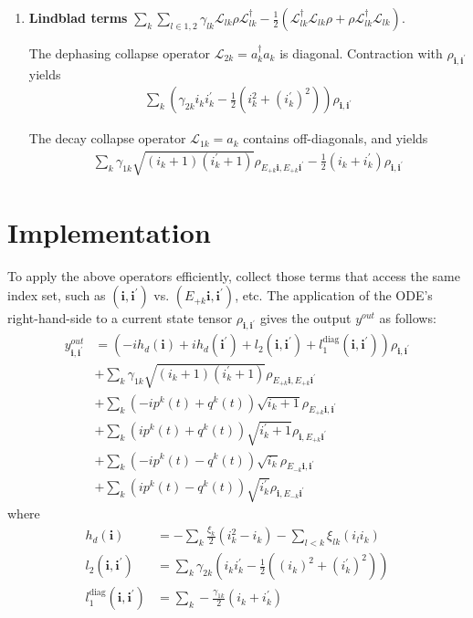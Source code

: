 \documentclass[letterpaper]{article}
\newcommand{\Ell}{\mathcal{L}}
\newcommand{\bfi}{\boldsymbol{i}}
\newcommand{\Epk}{E_{+k}}
\newcommand{\Emk}{E_{-k}}
\begin{document}
\begin{enumerate}
    \item \textbf{Lindblad terms} $\sum_k \sum_{l\in{1,2}} \gamma_{lk} \Ell_{lk} \rho \Ell_{lk}^\dag - \frac{1}{2} \left( \Ell_{lk}^\dag \Ell_{lk} \rho + \rho \Ell_{lk}^\dag \Ell_{lk}\right)$.
    
    The dephasing collapse operator $\Ell_{2k} = a_k^\dag a_k$ is diagonal. Contraction with $\rho_{\bfi,\bfi^\prime}$ yields
    \begin{align}
        \sum_k \left( \gamma_{2k} i_ki_k^\prime - \frac 12 \left( i_k^2 + (i_k^\prime)^2\right) \right) \rho_{\bfi,\bfi^\prime}
    \end{align}

    The decay collapse operator $\Ell_{1k} = a_k$ contains off-diagonals, and yields
    \begin{align}
        \sum_k \gamma_{1k} \sqrt{(i_k+1)(i_k^\prime+1)} \rho_{E_{+k}\bfi, E_{+k}\bfi^\prime} - \frac 12 \left( i_k+ i_k^\prime \right)\rho_{\bfi, \bfi^\prime} 
    \end{align}
      
\end{enumerate}

\section{Implementation}

  To apply the above operators efficiently, collect those terms that access the same index set, such as $(\bfi,\bfi^\prime)$ vs. $(E_{+k}\bfi, \bfi^\prime)$, etc. The application of the ODE's right-hand-side to a current state tensor $\rho_{\bfi,\bfi^\prime}$ gives the output $y^{out}$ as follows:
  \begin{align} 
       y^{out}_{\bfi,\bfi^\prime}  &= 
       \left(-i h_d(\bfi) + ih_d(\bfi^\prime)
        + l_2(\bfi,\bfi^\prime) + l_1^{\text{diag}}(\bfi, \bfi^\prime) \right) \rho_{\bfi,\bfi^\prime} \\ \label{eq:applyRHS1}
        &+ \sum_k \gamma_{1k} \sqrt{(i_k+1)(i_k^\prime+1)} \rho_{E_{+k}\bfi, E_{+k}\bfi^\prime}\\
        &+ \sum_k \left(-ip^k(t) + q^k(t)\right) \sqrt{i_k+1} \rho_{\Epk \bfi, \bfi^\prime} \\
        &+ \sum_k \left( ip^k(t) + q^k(t)\right) \sqrt{i_k^\prime+1} \rho_{\bfi,\Epk \bfi^\prime} \\
        &+ \sum_k \left(-ip^k(t) - q^k(t)\right) \sqrt{i_k} \rho_{\Emk \bfi, \bfi^\prime} \\
        &+ \sum_k \left( ip^k(t) - q^k(t)\right) \sqrt{i_k^\prime} \rho_{\bfi,\Emk \bfi^\prime}  \label{eq:applyRHS2}
  \end{align}
  where 
  \begin{align}
    h_d(\bfi) &= -\sum_k \frac{\xi_k}{2}(i_k^2 - i_k) - \sum_{l<k} \xi_{lk} (i_l i_k) \\
    l_2(\bfi,\bfi^\prime) &= \sum_k \gamma_{2k} \left(i_ki_k^\prime - \frac 12 \left( (i_k)^2 + (i_k^\prime)^2\right) \right)\\
    l_1^{\text{diag}}(\bfi, \bfi^\prime) &= \sum_k -\frac{\gamma_{1k}}{2}\left(i_k + i_k^\prime\right) 
  \end{align}
\end{document}
